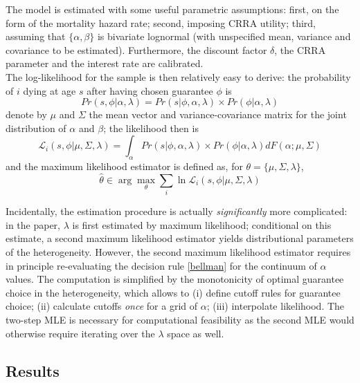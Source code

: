 \documentclass[11pt]{article}
\numberwithin{equation}{section}
\begin{document}
The model is estimated with some useful parametric assumptions: first, on the form of the mortality hazard rate; second, imposing CRRA utility; third, assuming that $\{\alpha, \beta\}$ is bivariate lognormal (with unspecified mean, variance and covariance to be estimated). Furthermore, the discount factor $\delta$, the CRRA parameter and the interest rate are calibrated. \\

The log-likelihood for the sample is then relatively easy to derive: the probability of $i$ dying at age $s$ after having chosen guarantee $\phi$ is
\begin{equation}
Pr(s, \phi | \alpha, \lambda) = Pr(s | \phi, \alpha, \lambda ) \times Pr(\phi | \alpha, \lambda )
\end{equation}
denote by $\mu$ and $\Sigma$ the mean vector and variance-covariance matrix for the joint distribution of $\alpha$ and $\beta$; the likelihood then is
\begin{equation}
	\mathscr{L}_i(s, \phi | \mu, \Sigma, \lambda) = \int_\alpha Pr(s | \phi, \alpha, \lambda ) \times Pr(\phi | \alpha, \lambda ) d F(\alpha; \mu, \Sigma)
\end{equation}
and the maximum likelihood estimator is defined as, for $\theta = \{\mu, \Sigma, \lambda\}$,
\begin{equation}
	\hat{\theta} \in \arg \max_\theta \sum_i \ln \mathscr{L}_i(s, \phi | \mu, \Sigma, \lambda)
\end{equation}

Incidentally, the estimation procedure is actually \textit{significantly} more complicated: in the paper, $\lambda$ is first estimated by maximum likelihood; conditional on this estimate, a second maximum likelihood estimator yields distributional parameters of the heterogeneity.
However, the second maximum likelihood estimator requires in principle re-evaluating the decision rule \eqref{bellman} for the continuum of $\alpha$ values.
The computation is simplified by the monotonicity of optimal guarantee choice in the heterogeneity, which allows to (i) define cutoff rules for guarantee choice; (ii) calculate cutoffs \textit{once} for a grid of $\alpha$; (iii) interpolate likelihood. The two-step MLE is necessary for computational feasibility as the second MLE would otherwise require iterating over the $\lambda$ space as well.

\subsection{Results}
\end{document}
